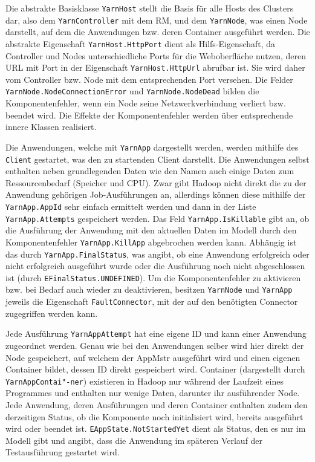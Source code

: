 Die abstrakte Basisklasse \texttt{YarnHost} stellt die Basis für alle Hosts des Clusters dar, also dem \texttt{YarnController} mit dem \ac{RM}, und dem \texttt{YarnNode}, was einen Node darstellt, auf dem die Anwendungen bzw. deren Container ausgeführt werden. Die abstrakte Eigenschaft \texttt{YarnHost.HttpPort} dient als Hilfs-Eigenschaft, da Controller und Nodes unterschiedliche Ports für die Weboberfläche nutzen, deren URL mit Port in der Eigenschaft \texttt{YarnHost.HttpUrl} abrufbar ist. Sie wird daher vom Controller bzw. Node mit dem entsprechenden Port versehen. Die Felder \texttt{YarnNode.NodeConnectionError} und \texttt{YarnNode.NodeDead} bilden die Komponentenfehler, wenn ein Node seine Netzwerkverbindung verliert bzw. beendet wird. Die Effekte der Komponentenfehler werden über entsprechende innere Klassen realisiert.

Die Anwendungen, welche mit \texttt{YarnApp} dargestellt werden, werden mithilfe des \texttt{Client} gestartet, was den zu startenden Client darstellt. Die Anwendungen selbst enthalten neben grundlegenden Daten wie \zB den Namen auch einige Daten zum Ressourcenbedarf (Speicher und CPU). Zwar gibt Hadoop nicht direkt die zu der Anwendung gehörigen Job-Ausführungen an, allerdings können diese mithilfe der \texttt{YarnApp.AppId} sehr einfach ermittelt werden und dann in der Liste \texttt{YarnApp.Attempts} gespeichert werden. Das Feld \texttt{YarnApp.IsKillable} gibt an, ob die Ausführung der Anwendung mit den aktuellen Daten im Modell durch den Komponentenfehler \texttt{YarnApp.KillApp} abgebrochen werden kann. Abhängig ist das durch \texttt{YarnApp.FinalStatus}, was angibt, ob eine Anwendung erfolgreich oder nicht erfolgreich ausgeführt wurde oder die Ausführung noch nicht abgeschlossen ist (durch \texttt{EFinalStatus.UNDEFINED}). Um die Komponentenfehler zu aktivieren bzw. bei Bedarf auch wieder zu deaktivieren, besitzen \texttt{YarnNode} und \texttt{YarnApp} jeweils die Eigenschaft \texttt{FaultConnector}, mit der auf den benötigten Connector zugegriffen werden kann.

Jede Ausführung \texttt{YarnAppAttempt} hat eine eigene ID und kann einer Anwendung zugeordnet werden. Genau wie bei den Anwendungen selber wird hier direkt der Node gespeichert, auf welchem der \ac{AppMstr} ausgeführt wird und einen eigenen Container bildet, dessen ID direkt gespeichert wird. Container (dargestellt durch \texttt{YarnAppContai"-ner}) existieren in Hadoop nur während der Laufzeit eines Programmes und enthalten nur wenige Daten, darunter ihr ausführender Node. Jede Anwendung, deren Ausführungen und deren Container enthalten zudem den derzeitigen Status, ob die Komponente noch initialisiert wird, bereits ausgeführt wird oder beendet ist. \texttt{EAppState.NotStartedYet} dient als Status, den es nur im Modell gibt und angibt, dass die Anwendung im späteren Verlauf der Testausführung gestartet wird.

